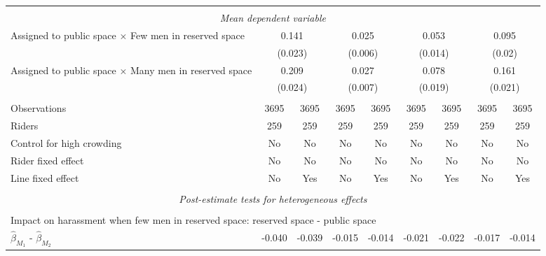 \begin{tabular}{l*{8}{c}}
\\[-1.8ex] \hline \\[-1.8ex] \multicolumn{9}{c}{\textit{Mean dependent variable}} \\ Assigned to public space $\times$ Few men in reserved space& \multicolumn{2}{c}{0.141} & \multicolumn{2}{c}{0.025} & \multicolumn{2}{c}{0.053} & \multicolumn{2}{c}{0.095} \\  & \multicolumn{2}{c}{(0.023)} & \multicolumn{2}{c}{(0.006)} & \multicolumn{2}{c}{(0.014)} & \multicolumn{2}{c}{(0.02)} \\ Assigned to public space $\times$ Many men in reserved space & \multicolumn{2}{c}{0.209} & \multicolumn{2}{c}{0.027} & \multicolumn{2}{c}{0.078} & \multicolumn{2}{c}{0.161} \\  & \multicolumn{2}{c}{(0.024)} & \multicolumn{2}{c}{(0.007)} & \multicolumn{2}{c}{(0.019)} & \multicolumn{2}{c}{(0.021)} \\\\[-1ex] 
Observations        &        3695         &        3695         &        3695         &        3695         &        3695         &        3695         &        3695         &        3695         \\
Riders              &         259         &         259         &         259         &         259         &         259         &         259         &         259         &         259         \\
Control for high crowding&          No         &          No         &          No         &          No         &          No         &          No         &          No         &          No         \\
Rider fixed effect  &          No         &          No         &          No         &          No         &          No         &          No         &          No         &          No         \\
Line fixed effect   &          No         &         Yes         &          No         &         Yes         &          No         &         Yes         &          No         &         Yes         \\
\hline \\[-1ex]  \multicolumn{9}{c}{\textit{Post-estimate tests for heterogeneous effects}} \\\\[-1ex] \multicolumn{9}{l}{Impact on harassment when few men in reserved space: reserved space - public space} \\ \quad $\hat\beta_{M_1}$ - $\hat\beta_{M_2}$&      -0.040         &      -0.039         &      -0.015         &      -0.014         &      -0.021         &      -0.022         &      -0.017         &      -0.014         \\

\end{tabular}
